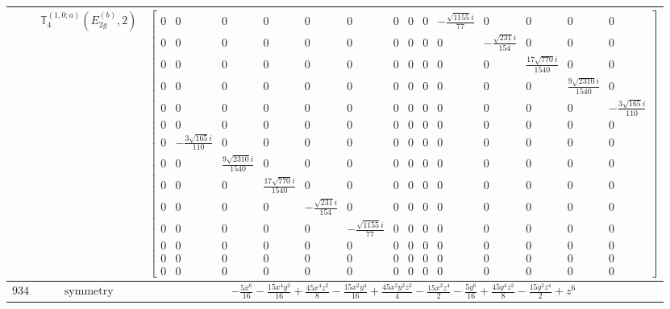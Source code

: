 \documentclass[fleqn,8pt,landscape]{jsarticle}
\begin{document}
\begin{longtable}{ccc}
$  $ & $ \mathbb{T}_{4}^{(1,0;a)}(E_{2g}^{(b)},2) $ & $ \begin{bmatrix} 0 & 0 & 0 & 0 & 0 & 0 & 0 & 0 & 0 & - \frac{\sqrt{1155} i}{77} & 0 & 0 & 0 & 0 \\ 0 & 0 & 0 & 0 & 0 & 0 & 0 & 0 & 0 & 0 & - \frac{\sqrt{231} i}{154} & 0 & 0 & 0 \\ 0 & 0 & 0 & 0 & 0 & 0 & 0 & 0 & 0 & 0 & 0 & \frac{17 \sqrt{770} i}{1540} & 0 & 0 \\ 0 & 0 & 0 & 0 & 0 & 0 & 0 & 0 & 0 & 0 & 0 & 0 & \frac{9 \sqrt{2310} i}{1540} & 0 \\ 0 & 0 & 0 & 0 & 0 & 0 & 0 & 0 & 0 & 0 & 0 & 0 & 0 & - \frac{3 \sqrt{165} i}{110} \\ 0 & 0 & 0 & 0 & 0 & 0 & 0 & 0 & 0 & 0 & 0 & 0 & 0 & 0 \\ 0 & - \frac{3 \sqrt{165} i}{110} & 0 & 0 & 0 & 0 & 0 & 0 & 0 & 0 & 0 & 0 & 0 & 0 \\ 0 & 0 & \frac{9 \sqrt{2310} i}{1540} & 0 & 0 & 0 & 0 & 0 & 0 & 0 & 0 & 0 & 0 & 0 \\ 0 & 0 & 0 & \frac{17 \sqrt{770} i}{1540} & 0 & 0 & 0 & 0 & 0 & 0 & 0 & 0 & 0 & 0 \\ 0 & 0 & 0 & 0 & - \frac{\sqrt{231} i}{154} & 0 & 0 & 0 & 0 & 0 & 0 & 0 & 0 & 0 \\ 0 & 0 & 0 & 0 & 0 & - \frac{\sqrt{1155} i}{77} & 0 & 0 & 0 & 0 & 0 & 0 & 0 & 0 \\ 0 & 0 & 0 & 0 & 0 & 0 & 0 & 0 & 0 & 0 & 0 & 0 & 0 & 0 \\ 0 & 0 & 0 & 0 & 0 & 0 & 0 & 0 & 0 & 0 & 0 & 0 & 0 & 0 \\ 0 & 0 & 0 & 0 & 0 & 0 & 0 & 0 & 0 & 0 & 0 & 0 & 0 & 0 \end{bmatrix} $ \\ \hline
$ 934 $ & $ \text{symmetry} $ & $ - \frac{5 x^{6}}{16} - \frac{15 x^{4} y^{2}}{16} + \frac{45 x^{4} z^{2}}{8} - \frac{15 x^{2} y^{4}}{16} + \frac{45 x^{2} y^{2} z^{2}}{4} - \frac{15 x^{2} z^{4}}{2} - \frac{5 y^{6}}{16} + \frac{45 y^{4} z^{2}}{8} - \frac{15 y^{2} z^{4}}{2} + z^{6} $ \\

\end{longtable}
\end{document}
